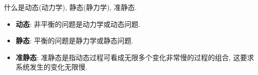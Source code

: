 \begin{problem}[07]
什么是动态(动力学), 静态(静力学), 准静态.
\end{problem}
\begin{solution}
\begin{itemize}
\item \textbf{动\hphantom{动}态}: 非平衡的问题是动力学或动态问题.
\item \textbf{静\hphantom{静}态}: 平衡的问题是静力学或静态问题.
\item \textbf{准静态}: 准静态是指动态过程可看成无限多个变化非常慢的过程的组合, 这要求系统发生的变化无限慢.
\end{itemize}
\end{solution}
